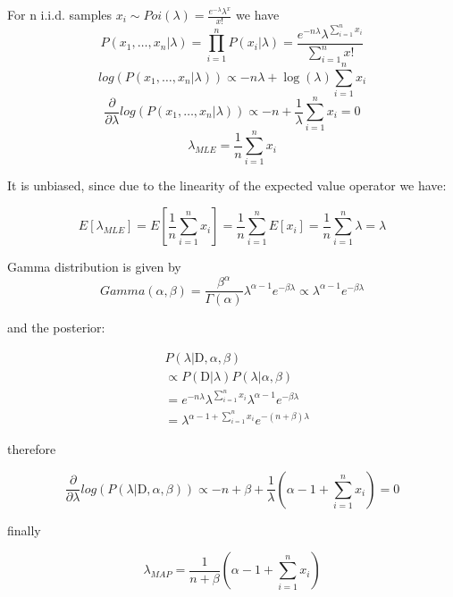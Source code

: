 \documentclass[12pt]{article}
\begin{document}
For n i.i.d. samples $x_i \sim  Poi(\lambda) = \frac{e^{-\lambda} \lambda^x}{x!}$ we have
\begin{equation}
  P(x_1, \ldots, x_n | \lambda) = \prod_{i=1}^{n} P(x_i | \lambda) = \frac{e^{-n\lambda} \lambda^{\sum_{i=1}^{n} x_i}}{\sum_{i=1}^{n} x!}
\end{equation}
\begin{equation}
  log\left(P(x_1, \ldots, x_n | \lambda)\right) \propto -n\lambda + \log(\lambda) \sum_{i=1}^{n} x_i
\end{equation}
\begin{equation}
  \frac{\partial}{\partial \lambda} log\left(P(x_1, \ldots, x_n | \lambda)\right) \propto -n + \frac{1}{\lambda} \sum_{i=1}^{n} x_i = 0
\end{equation}
\begin{equation}
 \lambda_{MLE} = \frac{1}{n} \sum_{i=1}^{n} x_i
\end{equation}

It is unbiased, since due to the linearity of the expected value operator we have:

\begin{equation}
 E[\lambda_{MLE}] = E[\frac{1}{n} \sum_{i=1}^{n} x_i] = \frac{1}{n} \sum_{i=1}^{n} E[x_i] = \frac{1}{n} \sum_{i=1}^{n} \lambda = \lambda
\end{equation}


Gamma distribution is given by 
\begin{equation}
    Gamma(\alpha, \beta) = \frac{\beta^\alpha}{\Gamma(\alpha)} \lambda^{\alpha-1} e^{-\beta \lambda} \propto \lambda^{\alpha-1} e^{-\beta \lambda}                            
\end{equation}

and the posterior:

\begin{equation}
\begin{align}
  &P(\lambda | \mathrm{D}, \alpha, \beta)\\ 
  &\propto P(\mathrm{D} | \lambda) P(\lambda | \alpha, \beta)\\
  &= e^{-n\lambda} \lambda^{\sum_{i=1}^{n} x_i}\lambda^{\alpha-1} e^{-\beta \lambda} \\
  &= \lambda^{\alpha-1 + \sum_{i=1}^{n} x_i} e^{-(n + \beta) \lambda} 
\end{align}
\end{equation}

therefore

\begin{equation}
  \frac{\partial}{\partial \lambda} log\left(P(\lambda | \mathrm{D}, \alpha, \beta)\right) \propto -n + \beta + \frac{1}{\lambda} \left( \alpha - 1 + \sum_{i=1}^{n} x_i \right) = 0
\end{equation}

finally

\begin{equation}
 \lambda_{MAP} = \frac{1}{n + \beta} \left( \alpha - 1 + \sum_{i=1}^{n} x_i \right)
\end{equation}
\end{document}
